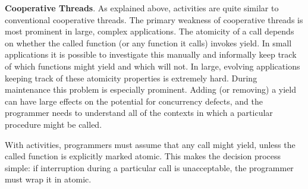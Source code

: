 \documentclass[9pt,preprint]{sigplanconf}
\begin{document}




\textbf{Cooperative Threads}.
As explained above, activities are quite similar to conventional cooperative threads.
The primary weakness of cooperative threads is most prominent in large, complex applications.
The atomicity of a call depends on whether the called function (or any function it calls) invokes yield.
In small applications it is possible to investigate this manually and informally keep track of which functions might yield and which will not.
In large, evolving applications keeping track of these atomicity properties is extremely hard.
During maintenance this problem is especially prominent.
Adding (or removing) a yield can have large effects on the potential for concurrency defects, and the programmer needs to understand all of the contexts in which a particular procedure might be called.

With activities, programmers must assume that any call might yield, unless the called function is explicitly marked atomic.
This makes the decision process simple: if interruption during a particular call is unacceptable, the programmer must wrap it in atomic.

\end{document}
